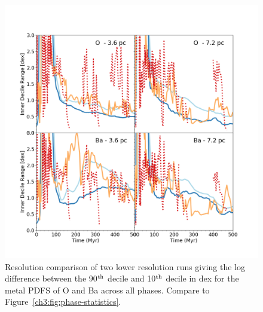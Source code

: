 \begin{figure}
\centering
\includegraphics[width=0.95\linewidth]{figures/ch3/O_Ba_resolution_study}
\caption{Resolution comparison of two lower resolution runs giving the log difference between the 90$^{\rm th}$ decile and 10$^{\rm th}$ decile in dex for the metal PDFS of O and Ba across all phases. Compare to Figure~\ref{ch3:fig:phase-statistics}.}
\label{ch3:fig:resolution-phase}
\end{figure}


\renewcommand\thesection{\thechapter.\arabic{section}}
